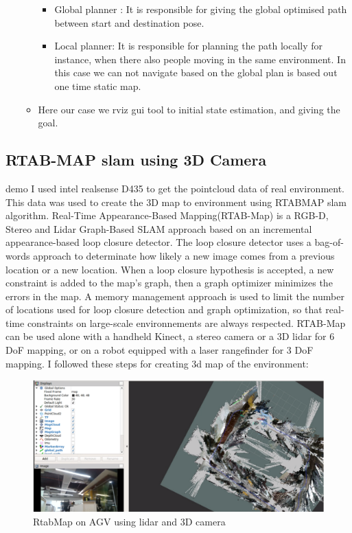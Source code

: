 \begin{itemize}
\begin{itemize}
\begin{itemize}
            \item Global planner : It is responsible for giving the global optimised path between start and destination pose.
            \item Local planner: It is responsible for planning the path locally for instance, when there also people moving in the same environment. In this case we can not navigate based on the global plan is based out one time static map.
        \end{itemize}
        \item Here our case we rviz gui tool to initial state estimation, and giving the goal.
    \end{itemize}
\end{itemize}


\subsection{RTAB-MAP slam using 3D Camera} demo
    I used intel realsense D435 to get the pointcloud data of real environment. This data was used to create the 3D map to environment using RTABMAP slam algorithm. Real-Time Appearance-Based Mapping(RTAB-Map) is a RGB-D, Stereo and Lidar Graph-Based SLAM approach based on an incremental appearance-based loop closure detector. The loop closure detector uses a bag-of-words approach to determinate how likely a new image comes from a previous location or a new location. When a loop closure hypothesis is accepted, a new constraint is added to the map’s graph, then a graph optimizer minimizes the errors in the map. A memory management approach is used to limit the number of locations used for loop closure detection and graph optimization, so that real-time constraints on large-scale environnements are always respected. RTAB-Map can be used alone with a handheld Kinect, a stereo camera or a 3D lidar for 6 DoF mapping, or on a robot equipped with a laser rangefinder for 3 DoF mapping. I followed these steps for creating 3d map of the environment:\cite{ustintern}
    \newline \begin{figure}[H]
        \centering
        \includegraphics[width=1.0\textwidth]{images/rtabmap.png}
        \caption{RtabMap on AGV using lidar and 3D camera}
    \end{figure}
